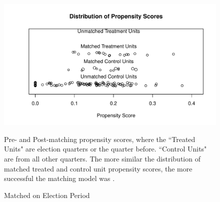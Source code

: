 \documentclass[a4paper]{article}\usepackage{graphicx, color}
\makeatletter
\def\maxwidth{ %
  \ifdim\Gin@nat@width>\linewidth
    \linewidth
  \else
    \Gin@nat@width
  \fi
}
\newenvironment{knitrout}{}{} %
\makeatother
\begin{document}
\begin{figure}[h]
  \caption{Matched on Election Period}
  \label{ElectPropensityScores}
\begin{knitrout}
\color{fgcolor}

{\centering \includegraphics[width=\maxwidth]{figure/ElectPropensity} 

}



\end{knitrout}

    \begin{singlespace}
        {\scriptsize{Pre- and Post-matching propensity scores, where the ``Treated Units" are election quarters or the quarter before. ``Control Units" are from all other quarters. The more similar the distribution of matched treated and control unit propensity scores, the more successful the matching model was \cite[17]{Hollyer2012}.}}
    \end{singlespace}
\end{figure}
\end{document}

